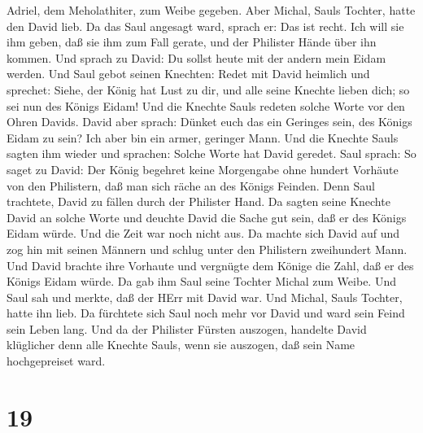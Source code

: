 Adriel, dem Meholathiter, zum Weibe gegeben.  Aber Michal,
Sauls Tochter, hatte den David lieb. Da das Saul angesagt ward, sprach
er: Das ist recht.  Ich will sie ihm geben, daß sie ihm zum
Fall gerate, und der Philister Hände über ihn kommen. Und sprach zu
David: Du sollst heute mit der andern mein Eidam werden. 
Und Saul gebot seinen Knechten: Redet mit David heimlich und sprechet:
Siehe, der König hat Lust zu dir, und alle seine Knechte lieben dich; so
sei nun des Königs Eidam!  Und die Knechte Sauls redeten
solche Worte vor den Ohren Davids. David aber sprach: Dünket euch das
ein Geringes sein, des Königs Eidam zu sein? Ich aber bin ein armer,
geringer Mann.  Und die Knechte Sauls sagten ihm wieder und
sprachen: Solche Worte hat David geredet.  Saul sprach: So
saget zu David: Der König begehret keine Morgengabe ohne hundert
Vorhäute von den Philistern, daß man sich räche an des Königs Feinden.
Denn Saul trachtete, David zu fällen durch der Philister Hand.
 Da sagten seine Knechte David an solche Worte und deuchte
David die Sache gut sein, daß er des Königs Eidam würde. Und die Zeit
war noch nicht aus.  Da machte sich David auf und zog hin
mit seinen Männern und schlug unter den Philistern zweihundert Mann. Und
David brachte ihre Vorhaute und vergnügte dem Könige die Zahl, daß er
des Königs Eidam würde. Da gab ihm Saul seine Tochter Michal zum Weibe.
 Und Saul sah und merkte, daß der HErr mit David war. Und
Michal, Sauls Tochter, hatte ihn lieb.  Da fürchtete sich
Saul noch mehr vor David und ward sein Feind sein Leben lang.
 Und da der Philister Fürsten auszogen, handelte David
klüglicher denn alle Knechte Sauls, wenn sie auszogen, daß sein Name
hochgepreiset ward.

\hypertarget{section-18}{%
\section{19}\label{section-18}}

